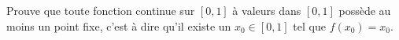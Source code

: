 \begin{exercice}\label{exo209}

Prouve que toute fonction continue sur $[0,1]$ à valeurs dans $[0,1]$ possède au moins un point fixe, c'est à dire qu'il existe un $x_0\in[0,1]$ tel que $f(x_0)=x_0$.

\end{exercice}


